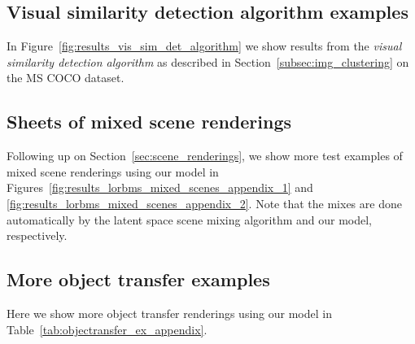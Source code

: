 \documentclass[12pt,a4paper]{article}
\begin{document}
\begin{appendices}
\subsection{Visual similarity detection algorithm examples}\label{app:vsda_examples}
In Figure~\ref{fig:results_vis_sim_det_algorithm} we show results from the \textit{visual similarity detection algorithm} as described in Section~\ref{subsec:img_clustering} on the MS COCO dataset.



\subsection{Sheets of mixed scene renderings}\label{app:mixed_scene_samples}
Following up on Section~\ref{sec:scene_renderings}, we show more test examples of mixed scene renderings using our model in Figures~\ref{fig:results_lorbms_mixed_scenes_appendix_1} and \ref{fig:results_lorbms_mixed_scenes_appendix_2}. Note that the mixes are done automatically by the latent space scene mixing algorithm and our model, respectively.


\subsection{More object transfer examples}\label{app:object_transfer_samples}
Here we show more object transfer renderings using our model in Table~\ref{tab:objectransfer_ex_appendix}.


\end{appendices}
\end{document}

